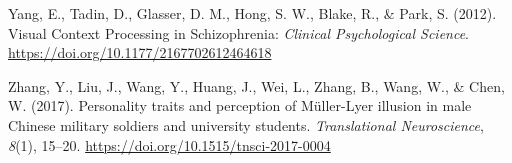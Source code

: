 \documentclass[
  man,floatsintext]{apa6}
\newlength{\cslhangindent}
\newlength{\cslentryspacingunit} %
\newenvironment{CSLReferences}[2] %
 {%
  \setlength{\parindent}{0pt}
  \ifodd #1
  \let\oldpar\par
  \def\par{\hangindent=\cslhangindent\oldpar}
  \fi
  \setlength{\parskip}{#2\cslentryspacingunit}
 }%
 {}
\begin{document}
\begin{CSLReferences}{1}{0}
\leavevmode{}%
Yang, E., Tadin, D., Glasser, D. M., Hong, S. W., Blake, R., \& Park, S. (2012). Visual Context Processing in Schizophrenia: \emph{Clinical Psychological Science}. \url{https://doi.org/10.1177/2167702612464618}

\leavevmode{}%
Zhang, Y., Liu, J., Wang, Y., Huang, J., Wei, L., Zhang, B., Wang, W., \& Chen, W. (2017). Personality traits and perception of Müller-Lyer illusion in male Chinese military soldiers and university students. \emph{Translational Neuroscience}, \emph{8}(1), 15--20. \url{https://doi.org/10.1515/tnsci-2017-0004}

\end{CSLReferences}


\clearpage
\renewcommand{\listfigurename}{Figure captions}
\end{document}
